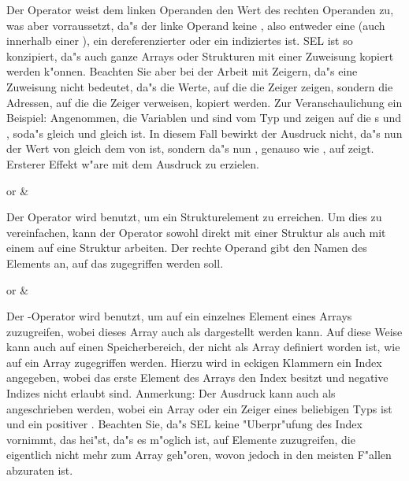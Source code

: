 Der Operator \fu{=} weist dem linken Operanden den Wert des
rechten Operanden zu, was aber vorraussetzt, da"s der linke
Operand keine , also entweder eine  (auch
innerhalb einer ), ein
dereferenzierter  oder ein indiziertes  ist. SEL ist
so konzipiert, da"s auch ganze Arrays oder Strukturen mit einer
Zuweisung kopiert werden k"onnen. Beachten Sie aber bei der
Arbeit mit Zeigern, da"s eine Zuweisung nicht bedeutet, da"s die
Werte, auf die die Zeiger zeigen, sondern die Adressen, auf die
die Zeiger verweisen, kopiert werden. Zur Veranschaulichung ein
Beispiel: Angenommen, die Variablen  und  sind vom
Typ  und zeigen auf die \tint s  und ,
soda"s  gleich  und  gleich  ist. In
diesem Fall bewirkt der Ausdruck  nicht, da"s nun der
Wert von  gleich dem von  ist, sondern da"s nun
, genauso wie , auf  zeigt. Ersterer Effekt
w"are mit dem Ausdruck  zu erzielen.

\begin{operator}
 or    & 
\end{operator}

Der Operator \fu{->} wird benutzt, um ein Strukturelement zu
erreichen. Um dies zu vereinfachen, kann der Operator sowohl
direkt mit einer Struktur als auch mit einem  auf eine
Struktur arbeiten. Der rechte Operand gibt den Namen des Elements
an, auf das zugegriffen werden soll.

\begin{operator}
 or  \fu{`['}  \fu{`]'} & 
\end{operator}

Der \fu{[]}-Operator wird benutzt, um auf ein einzelnes
Element eines Arrays zuzugreifen, wobei dieses Array auch als
 dargestellt werden kann. Auf diese Weise kann auch auf
einen Speicherbereich, der nicht als Array definiert worden ist,
wie auf ein Array zugegriffen werden. Hierzu wird in eckigen
Klammern ein Index angegeben, wobei das erste Element des Arrays
den Index  besitzt und negative Indizes nicht erlaubt sind.
Anmerkung: Der Ausdruck  kann auch als 
angeschrieben werden, wobei  ein Array oder ein Zeiger
eines beliebigen Typs ist und  ein positiver \tint .
Beachten Sie, da"s SEL keine "Uberpr"ufung des Index vornimmt,
das hei"st, da"s es m"oglich ist, auf Elemente zuzugreifen, die
eigentlich nicht mehr zum Array geh"oren, wovon jedoch in den
meisten F"allen abzuraten ist.


